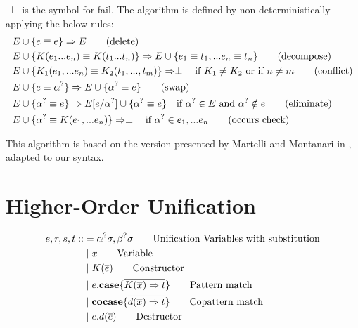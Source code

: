 \documentclass[twoside,12pt,a4paper]{article}
\begin{document}
\begin{definition}
    $\perp$ is the symbol for fail.
    The algorithm is defined by non-deterministically applying the below rules:
    \begin{align*}
        E & \cup \{ e \equiv e\} \Rightarrow E \tag{delete}\\
        E & \cup \{K(e_1 ... e_n) \equiv K(t_1 ... t_n)\} \Rightarrow E \cup \{e_1 \equiv t_1, ... e_n \equiv t_n\}\tag{decompose}\\
        E & \cup \{K_1(e_1,...e_n) \equiv K_2(t_1, ..., t_m)\}  \Rightarrow \perp \quad\text{if $K_1 \neq K_2$ or if $n\neq m$} \tag{conflict}\\
        E & \cup \{e \equiv \alpha^?\} \Rightarrow E \cup \{\alpha^? \equiv e\}\tag{swap}\\ 
        E & \cup \{\alpha^? \equiv e\} \Rightarrow E[e/\alpha^?] \cup \{\alpha^? \equiv e\} \quad\text{if $\alpha^? \in E$ and $\alpha^? \notin e$}  \tag{eliminate}\\
        E & \cup \{\alpha^? \equiv K(e_1,...e_n)\}\Rightarrow \perp \quad \text{if $\alpha^? \in e_1,...e_n$} \tag{occurs check} \label{a}
    \end{align*}
\end{definition}

This algorithm is based on the version presented by Martelli and Montanari in \cite{10.1145/357162.357169},
adapted to our syntax.

\section{Higher-Order Unification}\label{sec:Higher-Order Unification}

\begin{definition}
    \begin{align*}
        e,r,s,t  ::&= \alphaunifvar\sigma, \betaunifvar\sigma \tag*{Unification Variables with substitution}\\ %
            &\partition x  \tag*{Variable} \\
            &\partition\constructor \tag*{Constructor} \\
            &\partition\patmatch  \tag*{Pattern match}\\
            &\partition\copatmatch  \tag*{Copattern match}\\
            &\partition\destructor  \tag*{Destructor}
    \end{align*}
\end{definition}
\end{document}
